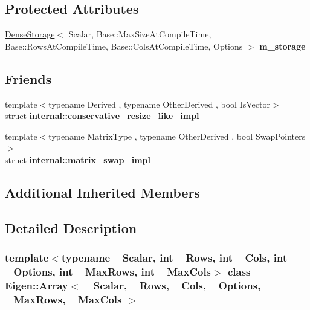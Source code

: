 \subsection*{Protected Attributes}
\begin{DoxyCompactItemize}
\item 
\mbox{\label{class_eigen_1_1_array_a1f9b65493a9a3eb3375c3177a080a5e1}} 
\mbox{\hyperlink{class_eigen_1_1_dense_storage}{Dense\+Storage}}$<$ Scalar, Base\+::\+Max\+Size\+At\+Compile\+Time, Base\+::\+Rows\+At\+Compile\+Time, Base\+::\+Cols\+At\+Compile\+Time, Options $>$ {\bfseries m\+\_\+storage}
\end{DoxyCompactItemize}
\subsection*{Friends}
\begin{DoxyCompactItemize}
\item 
\mbox{\label{class_eigen_1_1_array_a398280cc73160285ad14db73a8e85c94}} 
{\footnotesize template$<$typename Derived , typename Other\+Derived , bool Is\+Vector$>$ }\\struct {\bfseries internal\+::conservative\+\_\+resize\+\_\+like\+\_\+impl}
\item 
\mbox{\label{class_eigen_1_1_array_aab39995bda190be6874c21bc93040422}} 
{\footnotesize template$<$typename Matrix\+Type , typename Other\+Derived , bool Swap\+Pointers$>$ }\\struct {\bfseries internal\+::matrix\+\_\+swap\+\_\+impl}
\end{DoxyCompactItemize}
\subsection*{Additional Inherited Members}


\subsection{Detailed Description}
\subsubsection*{template$<$typename \+\_\+\+Scalar, int \+\_\+\+Rows, int \+\_\+\+Cols, int \+\_\+\+Options, int \+\_\+\+Max\+Rows, int \+\_\+\+Max\+Cols$>$\newline
class Eigen\+::\+Array$<$ \+\_\+\+Scalar, \+\_\+\+Rows, \+\_\+\+Cols, \+\_\+\+Options, \+\_\+\+Max\+Rows, \+\_\+\+Max\+Cols $>$}

